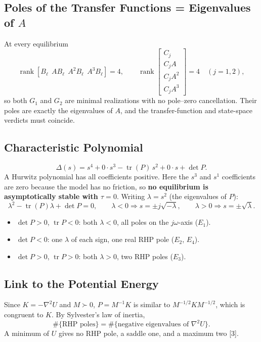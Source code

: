 \documentclass[12pt,a4paper]{article}
\begin{document}
\subsection{Poles of the Transfer Functions = Eigenvalues of $A$}
At every equilibrium
\[
\operatorname{rank}[B_\ell\ \ AB_\ell\ \ A^2B_\ell\ \ A^3B_\ell]=4,\qquad
\operatorname{rank}\begin{bmatrix}C_j\\C_jA\\C_jA^2\\C_jA^3\end{bmatrix}=4\quad(j=1,2),
\]
so both $G_1$ and $G_2$ are minimal realizations with no pole--zero cancellation. Their poles are exactly the eigenvalues of $A$, and the transfer-function and state-space verdicts must coincide.

\subsection{Characteristic Polynomial}
\begin{equation}
\Delta(s)=s^4+0\cdot s^3-\operatorname{tr}(P)\,s^2+0\cdot s+\det P .
\end{equation}
A Hurwitz polynomial has all coefficients positive. Here the $s^3$ and $s^1$ coefficients are zero because the model has no friction, so \textbf{no equilibrium is asymptotically stable with $\tau=0$}. Writing $\lambda=s^2$ (the eigenvalues of $P$):
\begin{equation}
\lambda^2-\operatorname{tr}(P)\lambda+\det P=0,\qquad \lambda<0\Rightarrow s=\pm j\sqrt{-\lambda},\qquad \lambda>0\Rightarrow s=\pm\sqrt\lambda .
\end{equation}
\begin{itemize}
\item $\det P>0$, $\operatorname{tr}P<0$: both $\lambda<0$, all poles on the $j\omega$-axis ($E_1$).
\item $\det P<0$: one $\lambda$ of each sign, one real RHP pole ($E_2$, $E_4$).
\item $\det P>0$, $\operatorname{tr}P>0$: both $\lambda>0$, two RHP poles ($E_3$).
\end{itemize}

\subsection{Link to the Potential Energy}
Since $K=-\nabla^2U$ and $M\succ0$, $P=M^{-1}K$ is similar to $M^{-1/2}KM^{-1/2}$, which is congruent to $K$. By Sylvester's law of inertia,
\begin{equation}
\#\{\text{RHP poles}\}=\#\{\text{negative eigenvalues of }\nabla^2U\}.
\end{equation}
A minimum of $U$ gives no RHP pole, a saddle one, and a maximum two [3].
\end{document}
